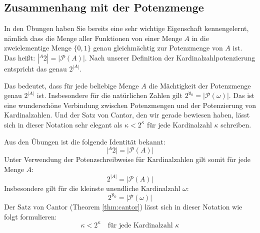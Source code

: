 \begin{math-stroke}
\end{math-stroke}

\subsection{Zusammenhang mit der Potenzmenge}

\begin{spoken-clean}[01:16:39 - 01:18:55]
In den Übungen haben Sie bereits eine sehr wichtige Eigenschaft kennengelernt, nämlich dass die Menge aller Funktionen von einer Menge $A$ in die zweielementige Menge $\{0, 1\}$ genau gleichmächtig zur Potenzmenge von $A$ ist. Das heißt: $|{}^A 2| = |\mathcal{P}(A)|$. Nach unserer Definition der Kardinalzahlpotenzierung entspricht das genau $2^{|A|}$.

Das bedeutet, dass für jede beliebige Menge $A$ die Mächtigkeit der Potenzmenge genau $2^{|A|}$ ist. Insbesondere für die natürlichen Zahlen gilt $2^{\aleph_0} = |\mathcal{P}(\omega)|$. Das ist eine wunderschöne Verbindung zwischen Potenzmengen und der Potenzierung von Kardinalzahlen. Und der Satz von Cantor, den wir gerade bewiesen haben, lässt sich in dieser Notation sehr elegant als $\kappa < 2^\kappa$ für jede Kardinalzahl $\kappa$ schreiben.
\end{spoken-clean}

\begin{math-stroke}
Aus den Übungen ist die folgende Identität bekannt:
\[
\bigl| {}^{A}2 \bigr| = |\mathcal{P}(A)|
\]
Unter Verwendung der Potenzschreibweise für Kardinalzahlen gilt somit für jede Menge $A$:
\[
2^{|A|} = |\mathcal{P}(A)|
\]
Insbesondere gilt für die kleinste unendliche Kardinalzahl $\omega$:
\[
2^{\aleph_0} = |\mathcal{P}(\omega)|
\]
Der Satz von Cantor (Theorem \ref{thm:cantor}) lässt sich in dieser Notation wie folgt formulieren:
\begin{equation}\label{eq:cantor-arithmetic}
\kappa < 2^\kappa \quad \text{für jede Kardinalzahl } \kappa
\end{equation}
\end{math-stroke}

